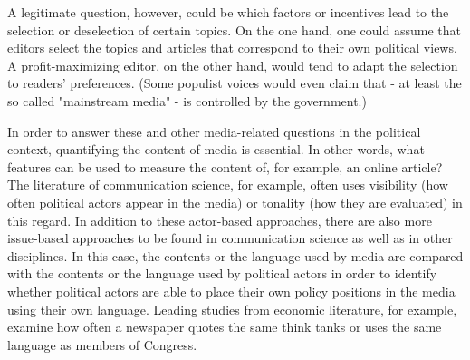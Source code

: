 \documentclass[12pt,a4paper,notitlepage]{article}
\begin{document}
A legitimate question, however, could be which factors or incentives lead to the selection or deselection of certain topics. On the one hand, one could assume that editors select the topics and articles that correspond to their own political views. A profit-maximizing editor, on the other hand, would tend to adapt the selection to readers' preferences. (Some populist voices would even claim that - at least the so called "mainstream media" - is controlled by the government.) 

In order to answer these and other media-related questions in the political context, quantifying the content of media is essential. In other words, what features can be used to measure the content of, for example, an online article? The literature of communication science, for example, often uses visibility (how often political actors appear in the media) or tonality (how they are evaluated) in this regard. In addition to these actor-based approaches, there are also more issue-based approaches to be found in communication science as well as in other disciplines. In this case, the contents or the language used by media are compared with the contents or the language used by political actors in order to identify whether political actors are able to place their own policy positions in the media using their own language. Leading studies from economic literature, for example, examine how often a newspaper quotes the same think tanks \citep{groseclose_measure_2005, lott_is_2014} or uses the same language \citep{gentzkow_media_2004} as members of Congress. 
\end{document}
